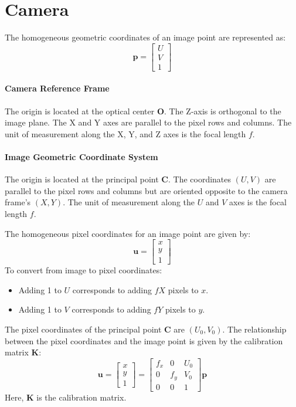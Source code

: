 \section{Camera}

The homogeneous geometric coordinates of an image point are represented as:
\[\mathbf{p} = \begin{bmatrix} U \\ V \\ 1 \end{bmatrix}\]

\paragraph*{Camera Reference Frame}
The origin is located at the optical center $\mathbf{O}$.
The Z-axis is orthogonal to the image plane.
The X and Y axes are parallel to the pixel rows and columns.
The unit of measurement along the X, Y, and Z axes is the focal length $f$.

\paragraph*{Image Geometric Coordinate System}
The origin is located at the principal point $\mathbf{C}$.
The coordinates $(U, V)$ are parallel to the pixel rows and columns but are oriented opposite to the camera frame's $(X, Y)$.
The unit of measurement along the $U$ and $V$ axes is the focal length $f$.

The homogeneous pixel coordinates for an image point are given by:
\[\mathbf{u} = \begin{bmatrix} x \\ y \\ 1 \end{bmatrix}\]
To convert from image to pixel coordinates:
\begin{itemize}
    \item Adding 1 to $U$ corresponds to adding $fX$ pixels to $x$.
    \item Adding 1 to $V$ corresponds to adding $fY$ pixels to $y$.
\end{itemize}
The pixel coordinates of the principal point $\mathbf{C}$ are $(U_0, V_0)$.
The relationship between the pixel coordinates and the image point is given by the calibration matrix $\mathbf{K}$:
\[\mathbf{u} = \begin{bmatrix} x \\ y \\ 1 \end{bmatrix} = \begin{bmatrix} f_x & 0 & U_0 \\ 0 & f_y & V_0 \\ 0 & 0 & 1 \end{bmatrix} \mathbf{p}\]
Here, $\mathbf{K}$ is the calibration matrix.

